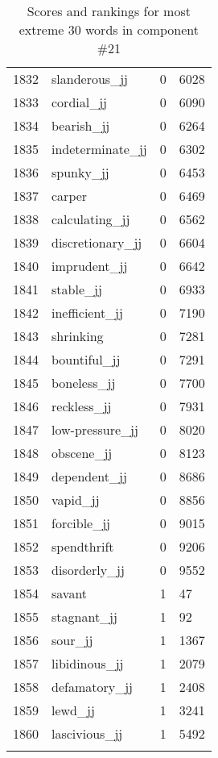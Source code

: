 \begin{longtable}[!htbp]{| rlr@{.}l |}
    1832 & slanderous\_jj & 0 & 6028 \\
    1833 & cordial\_jj & 0 & 6090 \\
    1834 & bearish\_jj & 0 & 6264 \\
    1835 & indeterminate\_jj & 0 & 6302 \\
    1836 & spunky\_jj & 0 & 6453 \\
    1837 & carper & 0 & 6469 \\
    1838 & calculating\_jj & 0 & 6562 \\
    1839 & discretionary\_jj & 0 & 6604 \\
    1840 & imprudent\_jj & 0 & 6642 \\
    1841 & stable\_jj & 0 & 6933 \\
    1842 & inefficient\_jj & 0 & 7190 \\
    1843 & shrinking & 0 & 7281 \\
    1844 & bountiful\_jj & 0 & 7291 \\
    1845 & boneless\_jj & 0 & 7700 \\
    1846 & reckless\_jj & 0 & 7931 \\
    1847 & low-pressure\_jj & 0 & 8020 \\
    1848 & obscene\_jj & 0 & 8123 \\
    1849 & dependent\_jj & 0 & 8686 \\
    1850 & vapid\_jj & 0 & 8856 \\
    1851 & forcible\_jj & 0 & 9015 \\
    1852 & spendthrift & 0 & 9206 \\
    1853 & disorderly\_jj & 0 & 9552 \\
    1854 & savant & 1 & 47 \\
    1855 & stagnant\_jj & 1 & 92 \\
    1856 & sour\_jj & 1 & 1367 \\
    1857 & libidinous\_jj & 1 & 2079 \\
    1858 & defamatory\_jj & 1 & 2408 \\
    1859 & lewd\_jj & 1 & 3241 \\
    1860 & lascivious\_jj & 1 & 5492 \\
    \hline
    \caption{Scores and rankings for most extreme 30 words in component \#21} \\
\end{longtable}
